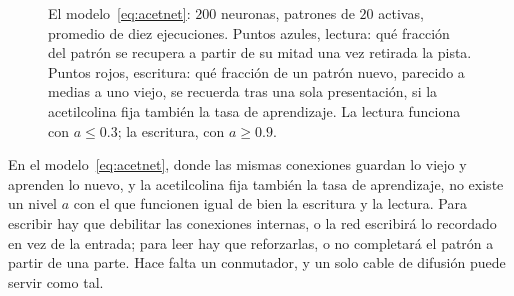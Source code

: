 \begin{figure}[t]
\centering
{}
\caption{El modelo~\eqref{eq:acetnet}: $200$ neuronas, patrones de $20$ activas, promedio de diez ejecuciones. Puntos azules, lectura: qué fracción del patrón se recupera a partir de su mitad una vez retirada la pista. Puntos rojos, escritura: qué fracción de un patrón nuevo, parecido a medias a uno viejo, se recuerda tras una sola presentación, si la acetilcolina fija también la tasa de aprendizaje. La lectura funciona con $a\le0.3$; la escritura, con $a\ge0.9$.}
\label{fig:acetsim}
\end{figure}

\begin{keyblock}
\begin{proposition}
\label{prop:writeread}
En el modelo~\eqref{eq:acetnet}, donde las mismas conexiones guardan lo viejo y aprenden lo nuevo, y la acetilcolina fija también la tasa de aprendizaje, no existe un nivel $a$ con el que funcionen igual de bien la escritura y la lectura. Para escribir hay que debilitar las conexiones internas, o la red escribirá lo recordado en vez de la entrada; para leer hay que reforzarlas, o no completará el patrón a partir de una parte. Hace falta un conmutador, y un solo cable de difusión puede servir como tal.
\end{proposition}
\end{keyblock}

